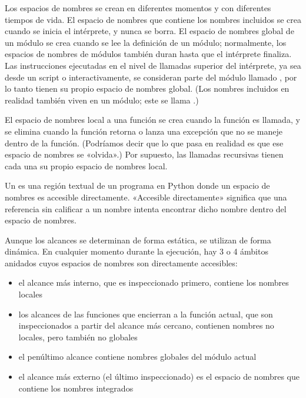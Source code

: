 \documentclass[a5paper,10pt,spanish]{sphinxmanual}
\begin{document}
\sphinxAtStartPar
Los espacios de nombres se crean en diferentes momentos y con diferentes tiempos de vida.  El espacio de nombres que contiene los nombres incluidos se crea cuando se inicia el intérprete, y nunca se borra.  El espacio de nombres global de un módulo se crea cuando se lee la definición de un módulo; normalmente, los espacios de nombres de módulos también duran hasta que el intérprete finaliza.  Las instrucciones ejecutadas en el nivel de llamadas superior del intérprete, ya sea desde un script o interactivamente, se consideran parte del módulo llamado , por lo tanto tienen su propio espacio de nombres global.  (Los nombres incluidos en realidad también viven en un módulo; este se llama .)

\sphinxAtStartPar
El espacio de nombres local a una función se crea cuando la función es llamada, y se elimina cuando la función retorna o lanza una excepción que no se maneje dentro de la función.  (Podríamos decir que lo que pasa en realidad es que ese espacio de nombres se «olvida».)  Por supuesto, las llamadas recursivas tienen cada una su propio espacio de nombres local.

\sphinxAtStartPar
Un  es una región textual de un programa en Python donde un espacio de nombres es accesible directamente.  «Accesible directamente» significa que una referencia sin calificar a un nombre intenta encontrar dicho nombre dentro del espacio de nombres.

\sphinxAtStartPar
Aunque los alcances se determinan de forma estática, se utilizan de forma dinámica. En cualquier momento durante la ejecución, hay 3 o 4 ámbitos anidados cuyos espacios de nombres son directamente accesibles:
\begin{itemize}
\item {} 
\sphinxAtStartPar
el alcance más interno, que es inspeccionado primero, contiene los nombres locales

\item {} 
\sphinxAtStartPar
los alcances de las funciones que encierran a la función actual, que son inspeccionados a partir del alcance más cercano, contienen nombres no locales, pero también no globales

\item {} 
\sphinxAtStartPar
el penúltimo alcance contiene nombres globales del módulo actual

\item {} 
\sphinxAtStartPar
el alcance más externo (el último inspeccionado) es el espacio de nombres que contiene los nombres integrados

\end{itemize}
\end{document}
